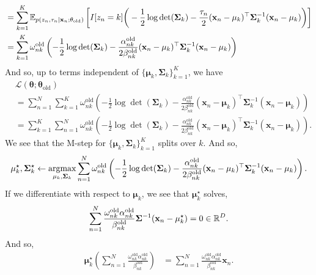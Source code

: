 \begin{enumerate}[label = (\alph*)]
\begin{align*}
        &=\sum_{k=1}^K {\mathbb E}_{p(z_n, \tau_n \mid \mathbf{x}_n;\mathbf{\theta}_{\mathrm{old}})}\left[I[z_n = k]\bigg(-\frac{1}{2}\log \det(\mathbf{\Sigma}_k) - \frac{\tau_n}{2}(\mathbf{x}_n - \mathbf{\mu}_k)^\top \mathbf{\Sigma}_k^{-1}(\mathbf{x}_n - \mathbf{\mu}_k) \bigg)\right]\\
        &=\sum_{k=1}^K \omega_{nk}^{\mathrm{old}}\left(-\frac{1}{2}\log \det(\mathbf{\Sigma}_k) - \frac{\alpha_{nk}^{\mathrm{old}}}{2\beta_{nk}^{\mathrm{old}}}(\mathbf{x}_n - \mathbf{\mu}_k)^\top \mathbf{\Sigma}_k^{-1}(\mathbf{x}_n - \mathbf{\mu}_k) \right)
    \end{align*}
    And so, up to terms independent of $\{\mathbf{\mu}_k,\mathbf{\Sigma}_k\}_{k=1}^K$, we have
    \begin{align*}
        &\mathcal{L}(\mathbf{\theta};\mathbf{\theta}_{\mathrm{old}})\\
        &=\sum_{n=1}^N\sum_{k=1}^K  \omega_{nk}^{\mathrm{old}}\left(-\frac{1}{2}\log \det(\mathbf{\Sigma}_k) - \frac{\alpha_{nk}^{\mathrm{old}}}{2\beta_{nk}^{\mathrm{old}}}(\mathbf{x}_n - \mathbf{\mu}_k)^\top \mathbf{\Sigma}_k^{-1}(\mathbf{x}_n - \mathbf{\mu}_k) \right)\\
        &=\sum_{k=1}^K\sum_{n=1}^N \omega_{nk}^{\mathrm{old}}\left(-\frac{1}{2}\log \det(\mathbf{\Sigma}_k) - \frac{\alpha_{nk}^{\mathrm{old}}}{2\beta_{nk}^{\mathrm{old}}}(\mathbf{x}_n - \mathbf{\mu}_k)^\top \mathbf{\Sigma}_k^{-1}(\mathbf{x}_n - \mathbf{\mu}_k) \right).
    \end{align*}
    We see that the M-step for $\{\mathbf{\mu}_k,\mathbf{\Sigma}_k\}_{k=1}^K$ splits over $k$. And so,
    \[\mathbf{\mu}_k^\star,\mathbf{\Sigma}_k^\star \gets \operatorname*{argmax}_{\mathbf{\mu}_k,\mathbf{\Sigma}_k} \sum_{n=1}^N \omega_{nk}^{\mathrm{old}}\left(-\frac{1}{2}\log \det(\mathbf{\Sigma}_k) - \frac{\alpha_{nk}^{\mathrm{old}}}{2\beta_{nk}^{\mathrm{old}}}(\mathbf{x}_n - \mathbf{\mu}_k)^\top \mathbf{\Sigma}_k^{-1}(\mathbf{x}_n - \mathbf{\mu}_k) \right). \]
    If we differentiate with respect to $\mathbf{\mu}_k$, we see that $\mathbf{\mu}_k^\star$ solves,
    \[\sum_{n=1}^N \frac{\omega_{nk}^{\mathrm{old}}\alpha_{nk}^{\mathrm{old}}}{\beta_{nk}^{\mathrm{old}}}\mathbf{\Sigma}^{-1} (\mathbf{x}_n-\mathbf{\mu}_k^\star)=0\in \mathbb{R}^D. \]
    And so,
    \begin{align*}
       \mathbf{\mu}_k^\star \left(\sum_{n=1}^N \frac{\omega_{nk}^{\mathrm{old}}\alpha_{nk}^{\mathrm{old}}}{\beta_{nk}^{\mathrm{old}}}\right) &= \sum_{n=1}^N \frac{\omega_{nk}^{\mathrm{old}}\alpha_{nk}^{\mathrm{old}}}{\beta_{nk}^{\mathrm{old}}} \mathbf{x}_n.

\end{align*}
\end{enumerate}
